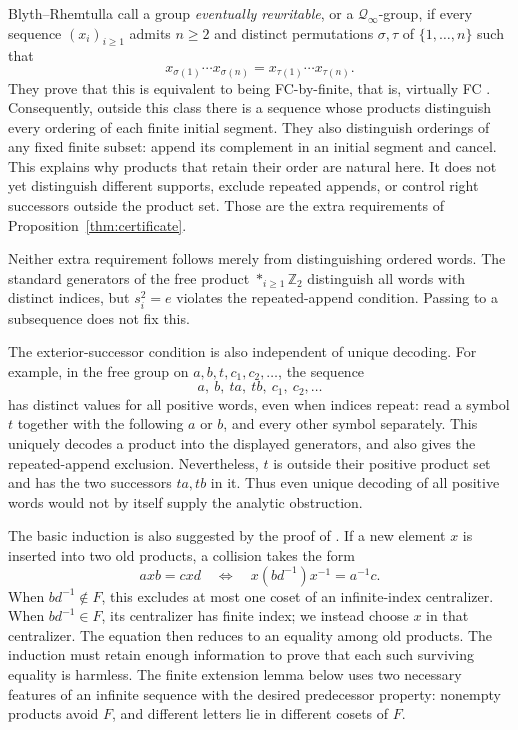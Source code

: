 \documentclass[11pt,letterpaper]{amsart}
\theoremstyle{definition}
\theoremstyle{remark}
\newcommand{\Z}{\mathbb Z}
\begin{document}
Blyth--Rhemtulla call a group \emph{eventually rewritable}, or a
$\mathcal Q_\infty$-group, if every sequence $(x_i)_{i\geq1}$ admits $n\geq2$
and distinct permutations $\sigma,\tau$ of $\{1,\ldots,n\}$ such that
\[
 x_{\sigma(1)}\cdots x_{\sigma(n)}
 =x_{\tau(1)}\cdots x_{\tau(n)}.
\]
They prove that this is equivalent to being FC-by-finite, that is,
virtually FC \cite[Proposition~2]{BR}. Consequently, outside this
class there is a sequence whose products distinguish every ordering
of each finite initial segment. They also distinguish orderings of
any fixed finite subset: append its complement in an initial segment
and cancel. This explains why products that retain their order are
natural here. It does not yet distinguish different supports, exclude
repeated appends, or control right successors outside the product set.
Those are the extra requirements of Proposition~\ref{thm:certificate}.

Neither extra requirement follows merely from distinguishing ordered
words. The standard generators of the free product
$\ast_{i\geq1}\Z_2$ distinguish all words with distinct indices, but
$s_i^2=e$ violates the repeated-append condition. Passing to a
subsequence does not fix this.

The exterior-successor condition is also independent of unique decoding.
For example, in the free group on $a,b,t,c_1,c_2,\ldots$, the sequence
\[
 a,\ b,\ ta,\ tb,\ c_1,\ c_2,\ldots
\]
has distinct values for all positive words, even when indices repeat:
read a symbol $t$ together with the following $a$ or $b$, and every
other symbol separately. This uniquely decodes a product into the
displayed generators, and also gives the repeated-append exclusion.
Nevertheless, $t$ is outside their positive
product set and has the two successors $ta,tb$ in it. Thus even
unique decoding of all positive words would not by itself supply
the analytic obstruction.

The basic induction is also suggested by the proof of
\cite[Lemma~3.3]{BR}. If a new element $x$ is inserted into two old
products, a collision takes the form
\[
 axb=cxd\quad\Longleftrightarrow\quad
 x(bd^{-1})x^{-1}=a^{-1}c.
\]
When $bd^{-1}\notin F$, this excludes at most one coset of an
infinite-index centralizer. When $bd^{-1}\in F$, its centralizer has
finite index; we instead choose $x$ in that centralizer. The equation
then reduces to an equality among old products. The induction must
retain enough information to prove that each such surviving equality
is harmless. The finite extension lemma below uses two necessary
features of an infinite sequence with the desired predecessor
property: nonempty products avoid $F$, and different letters lie in
different cosets of $F$.
\end{document}
